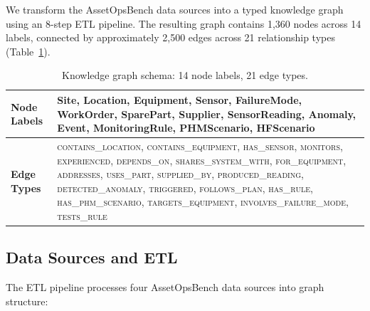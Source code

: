 \documentclass[11pt]{article}
\begin{document}
We transform the AssetOpsBench data sources into a typed knowledge graph using an 8-step ETL pipeline. The resulting graph contains 1{,}360 nodes across 14 labels, connected by approximately 2{,}500 edges across 21 relationship types (Table~\ref{tab:schema}).

\begin{table}[t]
  \centering
  \caption{Knowledge graph schema: 14 node labels, 21 edge types.}
  \label{tab:schema}
  \begin{tabular}{@{}lp{9cm}@{}}
    \toprule
    \textbf{Node Labels} & Site, Location, Equipment, Sensor, FailureMode, WorkOrder, SparePart, Supplier, SensorReading, Anomaly, Event, MonitoringRule, PHMScenario, HFScenario \\
    \midrule
    \textbf{Edge Types} & \textsc{contains\_location}, \textsc{contains\_equipment}, \textsc{has\_sensor}, \textsc{monitors}, \textsc{experienced}, \textsc{depends\_on}, \textsc{shares\_system\_with}, \textsc{for\_equipment}, \textsc{addresses}, \textsc{uses\_part}, \textsc{supplied\_by}, \textsc{produced\_reading}, \textsc{detected\_anomaly}, \textsc{triggered}, \textsc{follows\_plan}, \textsc{has\_rule}, \textsc{has\_phm\_scenario}, \textsc{targets\_equipment}, \textsc{involves\_failure\_mode}, \textsc{tests\_rule} \\
    \bottomrule
  \end{tabular}
\end{table}

\subsection{Data Sources and ETL}

The ETL pipeline processes four AssetOpsBench data sources into graph structure:
\end{document}
